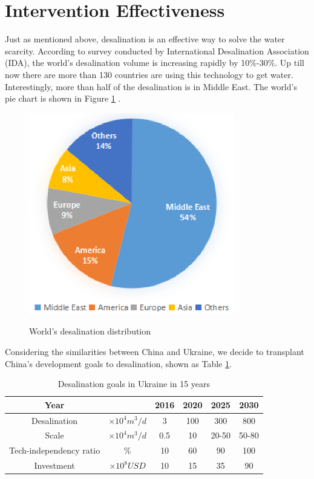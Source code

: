 \section{Intervention Effectiveness}
Just as mentioned above, desalination is an effective way to solve the water scarcity. According to survey conducted by International Desalination Association (IDA)\cite{EL}, the world's desalination volume is increasing rapidly by 10\%-30\%. Up till now there are more than 130 countries are using this technology to get water. Interestingly, more than half of the desalination is in Middle East. The world's pie chart is shown in Figure \ref{piechart} \cite{Junhong}.
\begin{figure}[!htbp]
  \centering
  \includegraphics[width=9cm]{./picture/piechart.eps}\\
  \caption{World's desalination distribution}\label{piechart}
\end{figure}

Considering the similarities between China and Ukraine, we decide to transplant China's development goals to desalination, shown as Table \ref{goals}.
\begin{table}[!htbp]
\centering\caption{Desalination goals in Ukraine in 15 years}
\begin{tabular}{cc|cccc}
  \hline
  Year &  & 2016 & 2020 & 2025 & 2030 \\
    \hline
  Desalination & $\times 10^4 m^3/d$ & 3 & 100 & 300 & 800 \\
  Scale & $\times 10^4 m^3/d$ & 0.5 & 10 & 20-50 & 50-80 \\
  Tech-independency ratio & \% & 10 & 60 & 90 & 100 \\
  Investment & $\times 10^8 USD$ & 10 & 15 & 35 & 90 \\
  \hline
\end{tabular}\label{goals}
\end{table}

